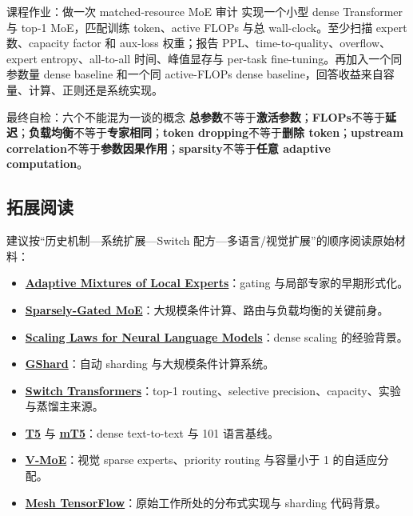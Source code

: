 \documentclass[a4paper]{article}
\begin{document}
\begin{importantbox}{课程作业：做一次 matched-resource MoE 审计}
实现一个小型 dense Transformer 与 top-1 MoE，匹配训练 token、active FLOPs 与总 wall-clock。至少扫描 expert 数、capacity factor 和 aux-loss 权重；报告 PPL、time-to-quality、overflow、expert entropy、all-to-all 时间、峰值显存与 per-task fine-tuning。再加入一个同参数量 dense baseline 和一个同 active-FLOPs dense baseline，回答收益来自容量、计算、正则还是系统实现。
\end{importantbox}

\begin{warningbox}{最终自检：六个不能混为一谈的概念}
\textbf{总参数}不等于\textbf{激活参数}；\textbf{FLOPs}不等于\textbf{延迟}；\textbf{负载均衡}不等于\textbf{专家相同}；\textbf{token dropping}不等于\textbf{删除 token}；\textbf{upstream correlation}不等于\textbf{参数因果作用}；\textbf{sparsity}不等于\textbf{任意 adaptive computation}。
\end{warningbox}

\subsection{拓展阅读}

建议按“历史机制—系统扩展—Switch 配方—多语言/视觉扩展”的顺序阅读原始材料：

{\small
\begin{itemize}[nosep,leftmargin=*]
  \item \href{https://doi.org/10.1162/neco.1991.3.1.79}{\textbf{Adaptive Mixtures of Local Experts}}：gating 与局部专家的早期形式化。
  \item \href{https://arxiv.org/abs/1701.06538}{\textbf{Sparsely-Gated MoE}}：大规模条件计算、路由与负载均衡的关键前身。
  \item \href{https://arxiv.org/abs/2001.08361}{\textbf{Scaling Laws for Neural Language Models}}：dense scaling 的经验背景。
  \item \href{https://arxiv.org/abs/2006.16668}{\textbf{GShard}}：自动 sharding 与大规模条件计算系统。
  \item \href{https://arxiv.org/abs/2101.03961}{\textbf{Switch Transformers}}：top-1 routing、selective precision、capacity、实验与蒸馏主来源。
  \item \href{https://arxiv.org/abs/1910.10683}{\textbf{T5}} 与 \href{https://arxiv.org/abs/2010.11934}{\textbf{mT5}}：dense text-to-text 与 101 语言基线。
  \item \href{https://arxiv.org/abs/2106.05974}{\textbf{V-MoE}}：视觉 sparse experts、priority routing 与容量小于 1 的自适应分配。
  \item \href{https://github.com/tensorflow/mesh}{\textbf{Mesh TensorFlow}}：原始工作所处的分布式实现与 sharding 代码背景。
\end{itemize}
}
\end{document}
